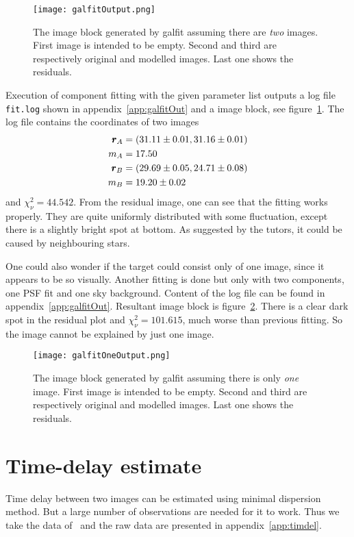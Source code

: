 \begin{figure}[ht]
	\centering
	\texttt{[image: galfitOutput.png]}
	\caption{The image block generated by galfit assuming there are \textit{two} images. First image is intended to be empty. Second and third are respectively original and modelled images. Last one shows the residuals.}%
	\label{fig:galfitOut}
\end{figure}
Execution of component fitting with the given parameter list outputs a log file \verb|fit.log| shown in appendix~\ref{app:galfitOut} and a image block, see figure~\ref{fig:galfitOut}. The log file contains the coordinates of two images
\begin{align}
	\begin{split}
	\pmb{r}_A &= (\num{31.11 +- 0.01}, \num{31.16 +- 0.01}) \\
	m_A &= \num{17.50 +- 0.00} \\
	\pmb{r}_B &= (\num{29.69 +- 0.05}, \num{24.71 +- 0.08}) \\
	m_B &= \num{19.20 +- 0.02}
	\end{split}\label{math:galfitResult}
\end{align}
and $\chi^2_\nu = \num{44.542}$. From the residual image, one can see that the fitting works properly. They are quite uniformly distributed with some fluctuation, except there is a slightly bright spot at bottom. As suggested by the tutors, it could be caused by neighbouring stars. 

One could also wonder if the target could consist only of one image, since it appears to be so visually. Another fitting is done but only with two components, one PSF fit and one sky background. Content of the log file can be found in appendix~\ref{app:galfitOut}. Resultant image block is figure~\ref{fig:galfitOneOut}. There is a clear dark spot in the residual plot and $\chi^2_\nu = 101.615$, much worse than previous fitting. So the image cannot be explained by just one image.
\begin{figure}[ht]
	\centering
	\texttt{[image: galfitOneOutput.png]}
	\caption{The image block generated by galfit assuming there is only \textit{one} image. First image is intended to be empty. Second and third are respectively original and modelled images. Last one shows the residuals.}%
	\label{fig:galfitOneOut}
\end{figure}

\clearpage
\section{Time-delay estimate} 
Time delay between two images can be estimated using minimal dispersion method. But a large number of observations are needed for it to work. Thus we take the data of~\cite{vuissoz} and the raw data are presented in appendix~\ref{app:timdel}.

